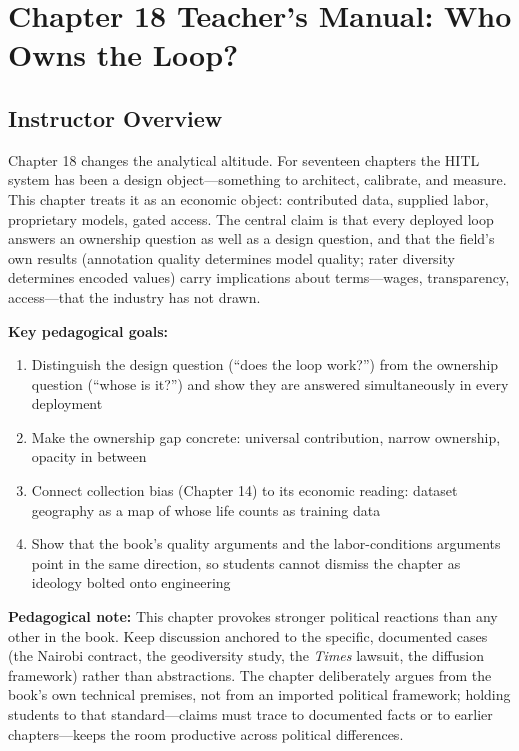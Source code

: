 
\section*{Chapter 18 Teacher's Manual: Who Owns the Loop?}

\subsection*{Instructor Overview}

Chapter 18 changes the analytical altitude. For seventeen chapters the HITL system has been a design object---something to architect, calibrate, and measure. This chapter treats it as an economic object: contributed data, supplied labor, proprietary models, gated access. The central claim is that every deployed loop answers an ownership question as well as a design question, and that the field's own results (annotation quality determines model quality; rater diversity determines encoded values) carry implications about terms---wages, transparency, access---that the industry has not drawn.

\textbf{Key pedagogical goals:}
\begin{enumerate}
    \item Distinguish the design question (``does the loop work?'') from the ownership question (``whose is it?'') and show they are answered simultaneously in every deployment
    \item Make the ownership gap concrete: universal contribution, narrow ownership, opacity in between
    \item Connect collection bias (Chapter 14) to its economic reading: dataset geography as a map of whose life counts as training data
    \item Show that the book's quality arguments and the labor-conditions arguments point in the same direction, so students cannot dismiss the chapter as ideology bolted onto engineering
\end{enumerate}

\textbf{Pedagogical note:} This chapter provokes stronger political reactions than any other in the book. Keep discussion anchored to the specific, documented cases (the Nairobi contract, the geodiversity study, the \textit{Times} lawsuit, the diffusion framework) rather than abstractions. The chapter deliberately argues from the book's own technical premises, not from an imported political framework; holding students to that standard---claims must trace to documented facts or to earlier chapters---keeps the room productive across political differences.

